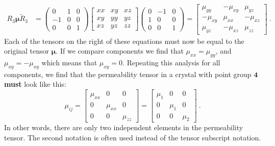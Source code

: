 {\begin{align*}
	R_3\bm{\mu}\tilde{R}_3 &= \begin{pmatrix}0&1&0\\  -1&0&0\\ 0&0&1\end{pmatrix}
	\begin{bmatrix}xx&xy&xz\\ xy&yy&yz\\ xz&yz&zz\end{bmatrix}\begin{pmatrix}0&-1&0\\ 1&0&0\\ 0&0&1\end{pmatrix} = 
	\left[\begin{array}{ccc} 
	 \mu_{yy} & -\mu_{xy} & \mu_{yz} \\ 
	-\mu_{xy} &  \mu_{xx} & -\mu_{xz} \\ 
	\mu_{yz} &  -\mu_{xz} & \mu_{zz}\end{array}\right]\ .
\end{align*}}
Each of the tensors on the right of these equations must now be equal to the original tensor $\bm{\mu}$.  If we
compare components we find that $\mu_{xx}=\mu_{yy}$, and $\mu_{xy}=-\mu_{xy}$ which means that 
$\mu_{xy}=0$.  Repeating this analysis for all components, we find that the permeability tensor in a crystal with point
group $\textbf{4}$ \textbf{must} look like this:
\begin{equation}
	\mu_{ij} =  \left[\begin{array}{ccc} 
	\mu_{xx} & 0 & 0 \\ 
	0 &  \mu_{xx} & 0 \\ 
	0 & 0 & \mu_{zz}\end{array}\right] = \left[\begin{array}{ccc} 
	\mu_{1} & 0 & 0 \\ 
	0 &  \mu_{1} & 0 \\ 
	0 & 0 & \mu_{2}\end{array}\right]\ .
\end{equation}
In other words, there are only two independent elements in the permeability tensor.  The second notation is often used instead of the tensor subscript notation.

